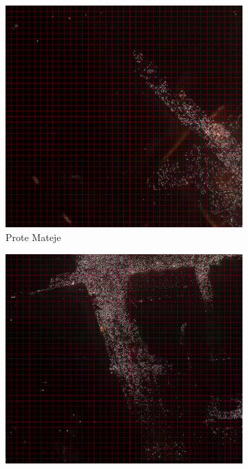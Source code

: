 \documentclass[a4paper,12pt]{article}
\begin{document}
\begin{figure}[H]
	\centering
  
	\begin{subfigure}[b]{0.3\textwidth}
	  \centering
	  \includegraphics[width=\textwidth]{../outputs/grid_output/prote-mateje_grid.png}
	  \caption{Prote Mateje}
	  \label{fig:prote-mateje}
	\end{subfigure}
	\hfill
	\begin{subfigure}[b]{0.3\textwidth}
	  \centering
	  \includegraphics[width=\textwidth]{../outputs/grid_output/nemanjina_grid.png}

\end{subfigure}
\end{figure}
\end{document}
